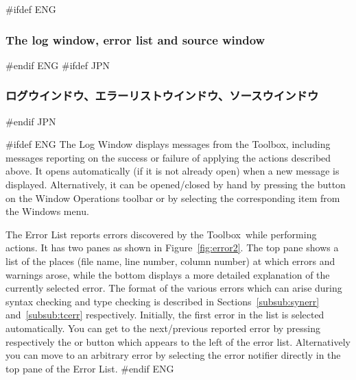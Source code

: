 \documentclass[\pformat,12pt]{article}
\newcommand{\Toolbox}{Toolbox}
\newcommand{\Toolbox}{Toolbox}
\newcommand{\guicmd}[1]{{\sf #1}}
\newcommand{\guicmd}[1]{{\gt #1}}
\begin{document}
#ifdef ENG
\subsubsection{The log window, error list and source window}
#endif ENG
#ifdef JPN
\subsubsection{ログウインドウ、エラーリストウインドウ、ソースウインドウ}
#endif JPN

#ifdef ENG
The \guicmd{Log Window} displays messages from the \Toolbox, including
messages reporting on the success or failure of applying the actions
described above. It opens automatically (if it is not already open)
when a new message is displayed. Alternatively, it can be
opened/closed by hand by pressing the 
button on the \guicmd{Window Operations} toolbar or by
selecting the corresponding item from the \guicmd{Windows} menu.


The \guicmd{Error List} reports errors discovered by the \Toolbox\
while performing actions. It has two panes as shown in
Figure~\ref{fig:error2}. The top pane shows a list of the places (file
name, line number, column number) at which errors and warnings arose,
while the bottom displays a more detailed explanation of the currently
selected error. The format of the various errors which can arise
  during syntax checking and type checking is described in
  Sections~\ref{subsub:synerr} and~\ref{subsub:tcerr} respectively.  
Initially, the first error in the list is selected
automatically. You can get to the next/previous reported error by
pressing respectively the {\fbox{\tt >}} or \fbox{{\tt <}} button
which appears to the left of the error list. Alternatively you can
move to an arbitrary error by selecting the error notifier directly in
the top pane of the \guicmd{Error List}.
#endif ENG
\end{document}
